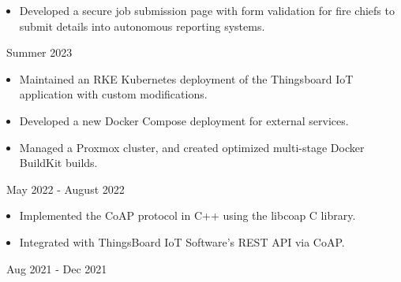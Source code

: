 \documentclass[11pt,letterpaper,ragged2e]{altacv}
\begin{document}

\hfuzz=5pt %

\begin{fullwidth}
  \makecvheader
\end{fullwidth}




{
  \begin{itemize}
    \item Developed a secure job submission page with form validation for fire chiefs to submit details into autonomous reporting systems.
  \end{itemize}
}
{\faCalendar\, Summer 2023}
{
}


{
  \begin{itemize}
    \item Maintained an RKE Kubernetes deployment of the Thingsboard IoT application with custom modifications.
    \item Developed a new Docker Compose deployment for external services.
    \item Managed a Proxmox cluster, and created optimized multi-stage Docker BuildKit builds.
  \end{itemize}
}
{\faCalendar\, May 2022 - August 2022}
{
}

{
  \begin{itemize}
    \item Implemented the CoAP protocol in C++ using the libcoap C library.
    \item Integrated with ThingsBoard IoT Software's REST API via CoAP.
  \end{itemize}
}
{\faCalendar\, Aug 2021 - Dec 2021}
{
}
\end{document}
